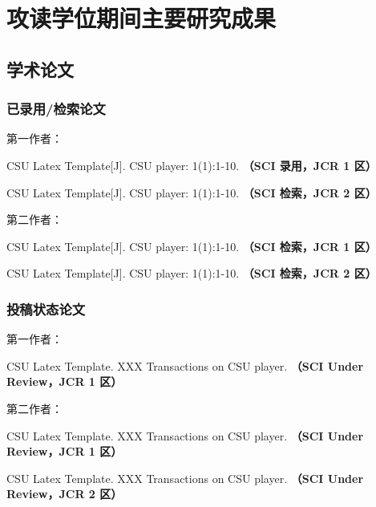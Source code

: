 
\section{{攻读学位期间主要研究成果}} %

\ifblindreview
\fi
\subsection*{学术论文}

\ifblindreview



\subsubsection*{已录用/检索论文}
\noindent
第一作者：
\begin{enumerate}[label={[\arabic*]},itemindent=2em,wide]
\item CSU Latex Template[J]. CSU player: 1(1):1-10. {\bfseries \heiti（SCI 录用，JCR 1 区）}
\item CSU Latex Template[J]. CSU player: 1(1):1-10. {\bfseries \heiti（SCI 检索，JCR 2 区）}
\end{enumerate}
第二作者：
\begin{enumerate}[label={[\arabic*]},itemindent=2em,wide]
\item CSU Latex Template[J]. CSU player: 1(1):1-10. {\bfseries \heiti（SCI 检索，JCR 1 区）}
\item CSU Latex Template[J]. CSU player: 1(1):1-10. {\bfseries \heiti（SCI 检索，JCR 2 区）}
\end{enumerate}
\noindent
\subsubsection*{投稿状态论文}
\noindent
第一作者：
\begin{enumerate}[label={[\arabic*]},itemindent=2em,wide]
\item CSU Latex Template. XXX Transactions on CSU player. {\bfseries \heiti（SCI Under Review，JCR 1 区）}
\end{enumerate}
第二作者：
\begin{enumerate}[label={[\arabic*]},itemindent=2em,wide]
\item CSU Latex Template. XXX Transactions on CSU player. {\bfseries \heiti（SCI Under Review，JCR 1 区）}
\item CSU Latex Template. XXX Transactions on CSU player. {\bfseries \heiti（SCI Under Review，JCR 2 区）}
\end{enumerate}


